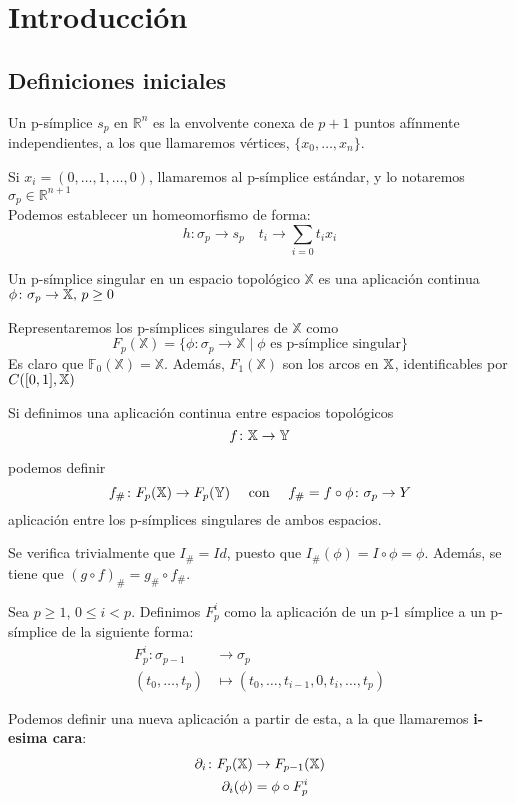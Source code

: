 \chapter{Introducción}\label{ch:introduccion}

\section{Definiciones iniciales}

\begin{definition}
Un p-símplice $s_p$ en $\mathbb{R}^n$ es la envolvente conexa de $p+1$ puntos afínmente independientes, a los que llamaremos vértices, $\{x_0, \dots, x_n\}$.
\end{definition}

Si $x_i = (0, \dots, 1, \dots, 0)$, llamaremos al p-símplice estándar, y lo notaremos $\sigma_p \in \mathbb{R}^{n+1}$ \\

Podemos establecer un homeomorfismo de forma: \[ h \colon \sigma_p \to s_p  \quad t_i \to \sum_{i=0} t_i x_i \]

\begin{definition}
Un p-símplice singular en un espacio topológico $\mathbb{X}$ es una aplicación continua $\phi \colon \sigma_p \to {\mathbb X} \text{, } p \geq 0$
\end{definition}

Representaremos los p-símplices singulares de $\mathbb{X}$ como
\[F_p(\mathbb{X}) = \{\phi \colon \sigma_p \to \mathbb{X} \mid \phi \text{ es p-símplice singular}\}\]
Es claro que $\mathbb{F}_0(\mathbb{X}) = \mathbb{X}$. Además, $F_1(\mathbb{X})$ son los arcos en ${\mathbb X}$, identificables por
$\mathbb \mathcal{C}([0,1], {\mathbb X})$

Si definimos una aplicación continua entre espacios topológicos
\[f \colon {\mathbb X} \to {\mathbb Y} \]

podemos definir
\[f_{\#} \colon F_{p}({\mathbb X}) \to F_{p}({\mathbb Y})  \quad \text{ con }  \quad f_{\#} = f \circ \phi \colon \sigma_p \to Y \]
aplicación entre los p-símplices singulares de ambos espacios.

Se verifica trivialmente que $I_\# = Id$, puesto que $I_\#(\phi) = I \circ \phi = \phi$.
Además, se tiene que $(g \circ f)_\# = g_\# \circ f_\#$.

\begin{definition}
  Sea $p \geq 1$, $0 \leq i < p$. Definimos $F_p^i$ como la aplicación de un p-1 símplice a un p-símplice de la siguiente forma:
  \begin{align*}
    F_p^i \colon \sigma_{p-1} &\to \sigma_p\\
    (t_0, \dots, t_p) &\mapsto (t_0, \dots, t_{i-1}, 0, t_i, \dots, t_p)
  \end{align*}

  Podemos definir una nueva aplicación a partir de esta, a la que llamaremos \textbf{i-esima cara}:
  \begin{align*}
    \partial_i \colon F_{p}({\mathbb X}) &\to F_{p-1}({\mathbb X})\\
    \partial_i(\phi) &= \phi \circ F_p^i
  \end{align*}
\end{definition}

